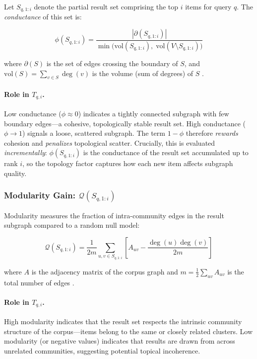 \documentclass[11pt,a4paper]{article}
\begin{document}
Let $S_{q,1:i}$ denote the partial result set comprising the top $i$ items
for query $q$.  The \emph{conductance} of this set is:

\begin{equation}
  \phi(S_{q,1:i})
  = \frac{|\partial(S_{q,1:i})|}
         {\min\bigl(\mathrm{vol}(S_{q,1:i}),\;
                     \mathrm{vol}(V \setminus S_{q,1:i})\bigr)}
  \label{eq:conductance}
\end{equation}

where $\partial(S)$ is the set of edges crossing the boundary of $S$,
and $\mathrm{vol}(S) = \sum_{v \in S} \deg(v)$ is the volume (sum of
degrees) of $S$ \cite{conductance_modularity}.

\paragraph{Role in $T_{q,i}$.}
Low conductance ($\phi \approx 0$) indicates a tightly connected subgraph
with few boundary edges---a cohesive, topologically stable result set.
High conductance ($\phi \to 1$) signals a loose, scattered subgraph.  The
term $1 - \phi$ therefore \emph{rewards} cohesion and \emph{penalizes}
topological scatter.  Crucially, this is evaluated \emph{incrementally}:
$\phi(S_{q,1:i})$ is the conductance of the result set accumulated up to
rank $i$, so the topology factor captures how each new item affects subgraph
quality.

\subsubsection{Modularity Gain: $\mathcal{Q}(S_{q,1:i})$}

Modularity measures the fraction of intra-community edges in the result
subgraph compared to a random null model:

\begin{equation}
  \mathcal{Q}(S_{q,1:i})
  = \frac{1}{2m} \sum_{u,v \in S_{q,1:i}}
    \left[ A_{uv} - \frac{\deg(u) \deg(v)}{2m} \right]
  \label{eq:modularity}
\end{equation}

where $A$ is the adjacency matrix of the corpus graph and
$m = \frac{1}{2}\sum_{uv} A_{uv}$ is the total number of edges
\cite{conductance_modularity}.

\paragraph{Role in $T_{q,i}$.}
High modularity indicates that the result set respects the intrinsic
community structure of the corpus---items belong to the same or closely
related clusters.  Low modularity (or negative values) indicates that
results are drawn from across unrelated communities, suggesting potential
topical incoherence.
\end{document}
